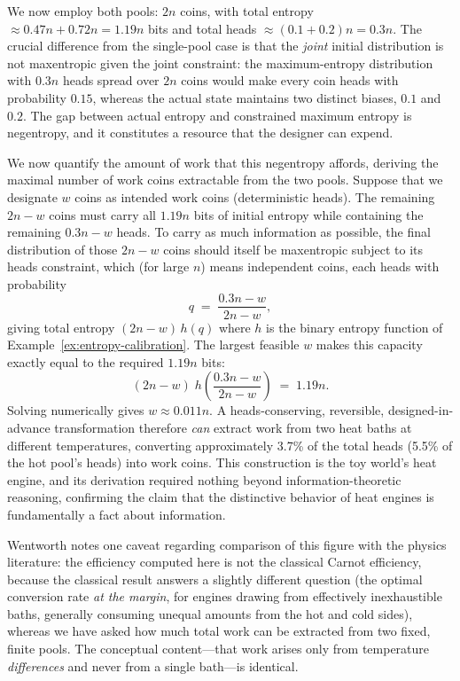\documentclass[11pt]{article}
\begin{document}
We now employ both pools: $2n$ coins, with total entropy $\approx 0.47n + 0.72n = 1.19n$ bits and total heads $\approx (0.1 + 0.2)n = 0.3n$. The crucial difference from the single-pool case is that the \emph{joint} initial distribution is not maxentropic given the joint constraint: the maximum-entropy distribution with $0.3n$ heads spread over $2n$ coins would make every coin heads with probability $0.15$, whereas the actual state maintains two distinct biases, $0.1$ and $0.2$. The gap between actual entropy and constrained maximum entropy is negentropy, and it constitutes a resource that the designer can expend.

We now quantify the amount of work that this negentropy affords, deriving the maximal number of work coins extractable from the two pools. Suppose that we designate $w$ coins as intended work coins (deterministic heads). The remaining $2n - w$ coins must carry all $1.19n$ bits of initial entropy while containing the remaining $0.3n - w$ heads. To carry as much information as possible, the final distribution of those $2n-w$ coins should itself be maxentropic subject to its heads constraint, which (for large $n$) means independent coins, each heads with probability
\[
q \;=\; \frac{0.3n - w}{2n - w},
\]
giving total entropy $(2n - w)\, h(q)$ where $h$ is the binary entropy function of Example~\ref{ex:entropy-calibration}. The largest feasible $w$ makes this capacity exactly equal to the required $1.19n$ bits:
\[
(2n - w)\; h\!\left(\frac{0.3n - w}{2n - w}\right) \;=\; 1.19n .
\]
Solving numerically gives $w \approx 0.011n$. A heads-conserving, reversible, designed-in-advance transformation therefore \emph{can} extract work from two heat baths at different temperatures, converting approximately 3.7\% of the total heads (5.5\% of the hot pool's heads) into work coins. This construction is the toy world's heat engine, and its derivation required nothing beyond information-theoretic reasoning, confirming the claim that the distinctive behavior of heat engines is fundamentally a fact about information.

Wentworth notes one caveat regarding comparison of this figure with the physics literature: the efficiency computed here is not the classical Carnot efficiency, because the classical result answers a slightly different question (the optimal conversion rate \emph{at the margin}, for engines drawing from effectively inexhaustible baths, generally consuming unequal amounts from the hot and cold sides), whereas we have asked how much total work can be extracted from two fixed, finite pools. The conceptual content---that work arises only from temperature \emph{differences} and never from a single bath---is identical.
\end{document}

